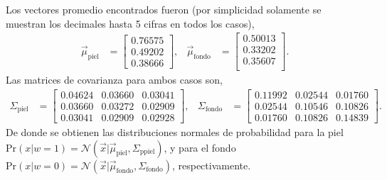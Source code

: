 Los vectores promedio encontrados fueron (por simplicidad solamente se muestran los decimales hasta 5 cifras en todos los casos),
\begin{align*}
    \vec{\mu}_{\text{piel}} & =
    \begin{bmatrix}
        0.76575 \\
        0.49202 \\
        0.38666
    \end{bmatrix} , &
    \vec{\mu}_{\text{fondo}} & =
    \begin{bmatrix}
        0.50013 \\
        0.33202 \\
        0.35607 \\
    \end{bmatrix} .
\end{align*}
Las matrices de covarianza para ambos casos son,
\begin{align*}
    \Sigma_{\text{piel}} & = 
    \begin{bmatrix}
        0.04624 & 0.03660 & 0.03041 \\
        0.03660 & 0.03272 & 0.02909 \\
        0.03041 & 0.02909 & 0.02928
    \end{bmatrix} , &
    \Sigma_{\text{fondo}} & = 
    \begin{bmatrix}
        0.11992 & 0.02544 & 0.01760 \\
        0.02544 & 0.10546 & 0.10826 \\
        0.01760 & 0.10826 & 0.14839
    \end{bmatrix} .
\end{align*}
De donde se obtienen las distribuciones normales de probabilidad para la piel $\text{Pr}(x | w = 1) = \mathcal{N}(\vec{x}|\vec{\mu}_{\text{piel}}, \Sigma_{\text{p{piel}}})$, y para el fondo $\text{Pr}(x | w = 0) = \mathcal{N}(\vec{x}|\vec{\mu}_{\text{fondo}}, \Sigma_{\text{fondo}})$, respectivamente.

